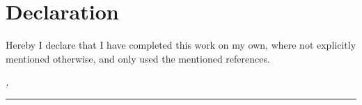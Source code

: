 \chapter*{Declaration}
\label{sec:declaration}
\thispagestyle{empty}

Hereby I declare that I have completed this work on my own, where not explicitly mentioned otherwise, and only used the mentioned references.

\bigskip

\noindent\textit{\thesisUniversityCity, \thesisDate}

\smallskip

\begin{flushright}
	\begin{minipage}{5cm}
		\rule{\textwidth}{1pt}
		\centering\thesisName
	\end{minipage}
\end{flushright}

